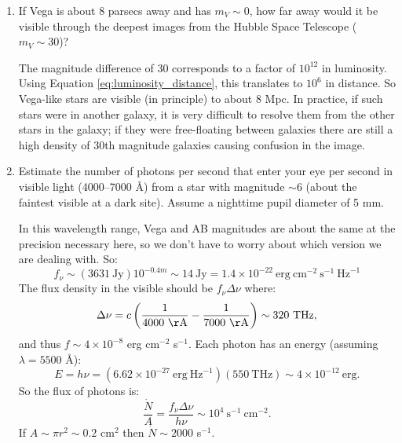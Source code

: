 \begin{enumerate} 
\item If Vega is about 8 parsecs away and has $m_V \sim 0$, how far
  away would it be visible through the deepest images from the Hubble
  Space Telescope ($m_V\sim 30$)?

\begin{answer}
  The magnitude difference of 30
    corresponds to a factor of $10^{12}$ in luminosity. Using Equation
    \ref{eq:luminosity_distance}, this translates to $10^6$ in
    distance. So Vega-like stars are visible (in principle) to about 8
    Mpc. In practice, if such stars were in another galaxy, it is very
    difficult to resolve them from the other stars in the galaxy; if
    they were free-floating between galaxies there are still a high
    density of 30th magnitude galaxies causing confusion in the image.
\end{answer}

\item Estimate the number of photons per second that enter your eye
    per second in visible light (4000--7000 \AA) from a star with
  magnitude $\sim 6$ (about the faintest visible at a dark
  site). Assume a nighttime pupil diameter of 5 mm.

\begin{answer}
In this wavelength range, Vega and AB magnitudes are about the same at
the precision necessary here, so we don't have to worry about which
version we are dealing with. So:
\begin{equation}
f_\nu \sim (3631 \mathrm{~Jy}) 10^{-0.4 m} \sim 14 \mathrm{~Jy} = 1.4 \times
10^{-22} \mathrm{~erg} \mathrm{~cm}^{-2} \mathrm{~s}^{-1} \mathrm{~Hz}^{-1}
\end{equation}
The flux density in the visible should be $f_\nu \Delta\nu$ where:
\begin{equation}
\Delta\nu = c \left(\frac{1}{4000 \mathrm{~\AA}} -
\frac{1}{7000 \mathrm{~\AA}}\right) \sim 320 \mathrm{~THz},
\end{equation}
and thus $f \sim 4\times 10^{-8}$ erg cm$^{-2}$ s$^{-1}$. Each photon
has an energy (assuming $\lambda = 5500$ \AA):
\begin{equation}
E = h\nu = (6.62\times
10^{-27} \mathrm{~erg~Hz}^{-1})( \mathrm{550~THz}) \sim 4 \times
10^{-12} \mathrm{~erg}.
\end{equation}
So the flux of photons is:
\begin{equation}
\frac{\dot N}{A} = \frac{f_\nu \Delta\nu}{h\nu} \sim 
10^4 \mathrm{~s}^{-1} \mathrm{~cm}^{-2}.
\end{equation}
If $A \sim \pi r^2 \sim 0.2$ cm$^2$ then $\dot N \sim 2000$ s$^{-1}$. 
\end{answer}


\end{enumerate}
